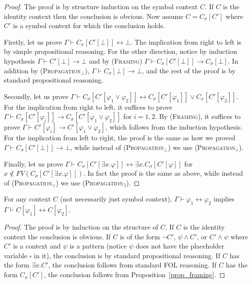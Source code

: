 \documentclass[acmsmall]{acmart}
\theoremstyle{acmdefinition}
\newcommand{\imp}{\to}
\newcommand{\dimp}{\leftrightarrow}
\newcommand{\CSub}[1]{C_{#1}}
\newcommand{\Csigmaapp}[1]{\CSub{\sigma}[#1]}
\newcommand{\prule}[1]{\textsc{(#1)}}
\newcommand{\propagationbottom}{\prule{Propagation$_\bot$}\xspace}
\newcommand{\propagationvee}{\prule{Propagation$_\vee$}\xspace}
\newcommand{\propagationexists}{\prule{Propagation$_\exists$}\xspace}
\newcommand{\framing}{\prule{Framing}\xspace}
\newcommand{\fv}{\mathit{FV}}
\newcommand{\FV}{\fv}
\newcommand{\hole}{\square}
\begin{document}
\begin{proof}
The proof is by structure induction on the symbol context $C$.
If $C$ is the identity context then the conclusion is obvious.
Now assume $C = \Csigmaapp{C'}$ where $C'$ is a symbol context
for which the conclusion holds.

Firstly, let us prove 
$\Gamma \vdash \Csigmaapp{C'[\bot]} \dimp \bot$.
The implication from right to left is by simple propositional reasoning.
For the other direction,
notice by induction hypothesis
$\Gamma \vdash C'[\bot] \imp \bot$
and by \framing
$\Gamma \vdash \Csigmaapp{C'[\bot]} \imp \Csigmaapp{\bot}$.
In addition by \propagationbottom,
$\Gamma \vdash \Csigmaapp{\bot} \imp \bot$,
and the rest of the proof is by standard propositional reasoning.

Secondly, let us prove
$\Gamma \vdash 
	          \Csigmaapp{C'[\varphi_1 \vee \varphi_2]} \dimp
	          \Csigmaapp{C'[\varphi_1]} \vee
	          \Csigmaapp{C'[\varphi_2]}$.
For the implication from right to left, 
it suffices to prove
$\Gamma \vdash \Csigmaapp{C'[\varphi_i]} 
  \imp \Csigmaapp{C'[\varphi_1 \vee \varphi_2]}$
for $i = 1, 2$.
By \framing, it suffices to prove
$\Gamma \vdash C'[\varphi_i]
  \imp C'[\varphi_1 \vee \varphi_2]$,
which follows from the induction hypothesis.
For the implication from left to right,
the proof is the same as 
how we proved $\Gamma \vdash \Csigmaapp{C'[\bot]} \imp \bot$,
while instead of \propagationbottom we use \propagationvee.

Finally, let us prove
$\Gamma \vdash
	          \Csigmaapp{C'[\exists x . \varphi]} \dimp
	          \exists x . \Csigmaapp{C'[\varphi]} $
for $x \not\in \FV(\Csigmaapp{C'[\exists x . \varphi]})$.
In fact the proof is the same as above, while instead of
\propagationvee we use \propagationexists.
\end{proof}

\begin{proposition}
\label{prop_congruence_provability_equiv}
For any context $C$ (not necessarily just symbol context),
$\Gamma \vdash \varphi_1 \dimp \varphi_2$
implies
$\Gamma \vdash C[\varphi_1] \dimp C[\varphi_2]$.
\end{proposition}
\begin{proof}
The proof is by induction on the structure of $C$.
If $C$ is the identity context the conclusion is obvious.
If $C$ is of the form 
$\neg C'$, 
$\psi \wedge C'$,
or $C' \wedge \psi$
where $C'$ is a context and $\psi$ is a pattern
(notice $\psi$ does not have the placeholder variable $\hole$ in it),
the conclusion is by standard propositional reasoning.
If $C$ has the form $\exists x . C'$,
the conclusion follows from standard FOL reasoning.
If $C$ has the form $\Csigmaapp{C'}$,
the conclusion follows from Proposition~\ref{prop_framing}.
\end{proof}
\end{document}
